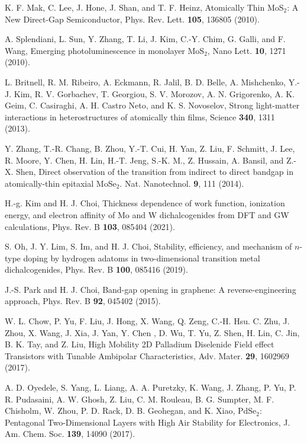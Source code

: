\documentclass[aps,prb,longbibliography,twocolumn]{revtex4-2}
\begin{document}
\begin{thebibliography}{11}

K. F. Mak, C. Lee, J. Hone, J. Shan, and T. F. Heinz, 
Atomically Thin MoS$_2$: A New Direct-Gap Semiconductor, Phys. Rev. Lett. {\bf 105}, 136805 (2010).

A. Splendiani, L. Sun, Y. Zhang, T. Li, J. Kim, C.-Y. Chim, G. Galli, and F. Wang, Emerging photoluminescence in monolayer MoS$_2$, Nano Lett. {\bf 10}, 1271 (2010).

L. Britnell, R. M. Ribeiro, A. Eckmann, R. Jalil, B. D. Belle, A. Mishchenko, Y.-J. Kim, R. V. Gorbachev, T. Georgiou, S. V. Morozov, A. N. Grigorenko, A. K. Geim, C. Casiraghi, A. H. Castro Neto, and K. S. Novoselov, Strong light-matter interactions in heterostructures of atomically thin films, Science {\bf 340}, 1311 (2013).

Y. Zhang, T.-R. Chang, B. Zhou, Y.-T. Cui, H. Yan, Z. Liu, F. Schmitt, J. Lee, R. Moore, Y. Chen, H. Lin, H.-T. Jeng, S.-K. M., Z. Hussain, A. Bansil, and Z.-X. Shen, Direct observation of the transition from indirect to direct bandgap in atomically-thin epitaxial MoSe$_2$. Nat. Nanotechnol. {\bf 9}, 111 (2014).

H.-g. Kim and H. J. Choi, Thickness dependence of work function, ionization energy, and electron affinity of Mo and W dichalcogenides from DFT and GW calculations, Phys. Rev. B {\bf 103}, 085404 (2021).

S. Oh, J. Y. Lim, S. Im, and H. J. Choi, Stability, efficiency, and mechanism of $n$-type doping by hydrogen adatoms in two-dimensional transition metal dichalcogenides, Phys. Rev. B {\bf 100}, 085416 (2019).

J.-S. Park and H. J. Choi, Band-gap opening in graphene: A reverse-engineering approach, Phys. Rev. B {\bf 92}, 045402 (2015).

W. L. Chow, P. Yu, F. Liu, J. Hong, X. Wang, Q. Zeng, C.-H. Hsu. C. Zhu, J. Zhou, X. Wang, J. Xia, J. Yan, Y. Chen , D. Wu, T. Yu, Z. Shen, H. Lin, C. Jin, B. K. Tay, and Z. Liu, High Mobility 2D Palladium Diselenide Field effect Transistors with Tunable Ambipolar Characteristics, Adv. Mater. {\bf 29}, 1602969 (2017). 

A. D. Oyedele, S. Yang, L. Liang, A. A. Puretzky, K. Wang, J. Zhang, P. Yu, P. R. Pudasaini, A. W. Ghosh, Z. Liu, C. M. Rouleau, B. G. Sumpter, M. F. Chisholm, W. Zhou, P. D. Rack, D. B. Geohegan, and K. Xiao, PdSe$_2$: Pentagonal Two-Dimensional Layers with High Air Stability for Electronics, J. Am. Chem. Soc. {\bf 139}, 14090 (2017).


\end{thebibliography}
\end{document}

